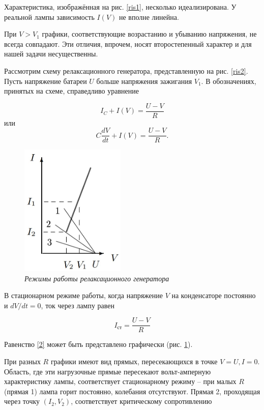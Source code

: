 \documentclass[a4paper,12pt]{article} %
\begin{document}
Характеристика, изображённая на рис. \ref{ris1}, несколько идеализирована. У реальной лампы зависимость $ I(V) $ не вполне линейна.



При $ V > V_1 $ графики, соответствующие возрастанию и убыванию напряжения, не всегда совпадают. Эти отличия, впрочем, носят второстепенный характер и для нашей задачи несущественны.

Рассмотрим схему релаксационного генератора, представленную на рис. \ref{ris2}. Пусть напряжение батареи $ U $ больше напряжения зажигания $ V_1 $. В обозначениях, принятых на схеме, справедливо уравнение

\[ I_C+I(V)=\frac{U-V}{R} \]
или
\begin{equation}\label{1}
C\frac{dV}{dt}+I(V)=\frac{U-V}{R}.
\end{equation}

\begin{figure}
	\includegraphics[width=5cm]{ris3.jpg}
	\caption{\textit{Режимы работы релаксационного генератора}}
	\label{ris3}
\end{figure}

В стационарном режиме работы, когда напряжение $ V $ на конденсаторе постоянно и $ dV/dt=0 $, ток через лампу равен

\begin{equation}\label{2}
I_\text{ст}=\frac{U-V}{R}
\end{equation}

Равенство \eqref{2} может быть представлено графически (рис. \ref{ris3}).

При разных $ R $ графики имеют вид прямых, пересекающихся в точке $ V=U, I=0 $. Область, где эти нагрузочные прямые пересекают вольт-амперную характеристику лампы, соответствует стационарному режиму -- при малых $ R $ (прямая 1) лампа горит постоянно, колебания отсутствуют. Прямая 2, проходящая через точку $ (I_2, V_2) $, соответствует критическому сопротивлению
\end{document}
